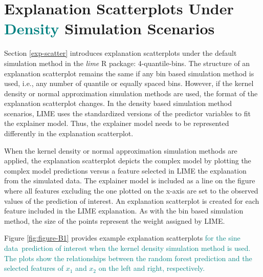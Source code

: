 \documentclass[AMS,STIX2COL]{WileyNJD-v2}\usepackage[]{graphicx}\usepackage[]{color}
\newcommand{\kge}[1]{\textcolor{teal}{#1}}
\newcommand{\data}{sine data}
\renewcommand{\sout}[1]{\unskip}
\begin{document}
\section{Explanation Scatterplots Under \sout{Other} \kge{Density} Simulation Scenarios} \label{exp-scatter_plus}

Section \ref{exp-scatter} introduces explanation scatterplots under the default simulation method in the \emph{lime} R package: 4-quantile-bins. The structure of an explanation scatterplot remains the same if any bin based simulation method is used, i.e., any number of quantile or equally spaced bins. However, if the kernel density or normal approximation simulation methods are used, the format of the explanation scatterplot changes. In the density based simulation method scenarios, LIME uses the standardized versions of the predictor variables to fit the explainer model. Thus, the explainer model needs to be represented differently in the explanation scatterplot.

When the kernel density or normal approximation simulation methods are applied, the explanation scatterplot depicts the complex model by plotting the complex model predictions versus a feature selected in LIME the explanation from the simulated data. The explainer model is included as a line on the figure where all features excluding the one plotted on the x-axis are set to the observed values of the prediction of interest. An explanation scatterplot is created for each feature included in the LIME explanation. As with the bin based simulation method, the size of the points represent the weight assigned by LIME.

Figure \ref{fig:figure-B1} provides example explanation scatterplots \kge{for the \data \ prediction of interest when the kernel density simulation method is used. The plots show the relationships between the random forest prediction and the selected features of $x_1$ and $x_2$ on the left and right, respectively.} \sout{for each feature in the default LIME explanation obtained using the kernel density simulation method for the \data \ prediction of interest.} \sout{Figure \ref{fig:figure-F5} includes explanation scatterplots for the explanations generated using kernel density simulation for the bullet example cases M and NM discussed in Section \ref{bullet-assess-ex}.}
\end{document}

